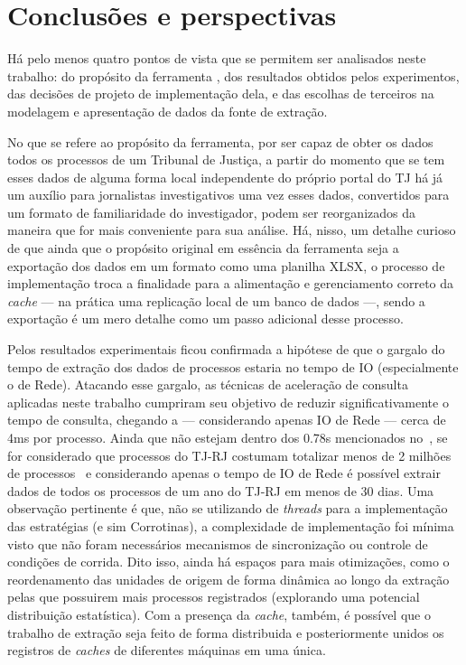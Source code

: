 \chapter{Conclusões e perspectivas~\label{chp:conclusions}}

Há pelo menos quatro pontos de vista que se permitem ser analisados neste
trabalho: do propósito da ferramenta \tjscraper, dos resultados obtidos pelos
experimentos, das decisões de projeto de implementação dela, e das escolhas de
terceiros na modelagem e apresentação de dados da fonte de extração.

No que se refere ao propósito da ferramenta, por ser capaz de obter os dados
todos os processos de um Tribunal de Justiça, a partir do momento que se tem
esses dados de alguma forma local independente do próprio portal do TJ há já um
auxílio para jornalistas investigativos uma vez esses dados, convertidos para
um formato de familiaridade do investigador, podem ser reorganizados da maneira
que for mais conveniente para sua análise. Há, nisso, um detalhe curioso de que
ainda que o propósito original em essência da ferramenta seja a exportação dos
dados em um formato como uma planilha XLSX, o processo de implementação troca a
finalidade para a alimentação e gerenciamento correto da \textit{cache} --- na
prática uma replicação local de um banco de dados ---, sendo a exportação é um
mero detalhe como um passo adicional desse processo.

Pelos resultados experimentais ficou confirmada a hipótese de que o gargalo do
tempo de extração dos dados de processos estaria no tempo de IO (especialmente
o de Rede). Atacando esse gargalo, as técnicas de aceleração de consulta
aplicadas neste trabalho cumpriram seu objetivo de reduzir significativamente o
tempo de consulta, chegando a --- considerando apenas IO de Rede --- cerca de
4ms por processo. Ainda que não estejam dentro dos 0.78s mencionados
no~, se for considerado que processos do
TJ-RJ costumam totalizar menos de 2 milhões de
processos~\cite{conjur:tj-novos-processos,amaerj:tj-novos-processos} e
considerando apenas o tempo de IO de Rede é possível extrair dados de todos os
processos de um ano do TJ-RJ em menos de 30 dias. Uma observação pertinente é
que, não se utilizando de \textit{threads} para a implementação das estratégias
(e sim Corrotinas), a complexidade de implementação foi mínima visto que não
foram necessários mecanismos de sincronização ou controle de condições de
corrida. Dito isso, ainda há espaços para mais otimizações, como o
reordenamento das unidades de origem de forma dinâmica ao longo da extração
pelas que possuirem mais processos registrados (explorando uma potencial
distribuição estatística). Com a presença da \textit{cache}, também, é possível
que o trabalho de extração seja feito de forma distribuida e posteriormente
unidos os registros de \textit{caches} de diferentes máquinas em uma única.


